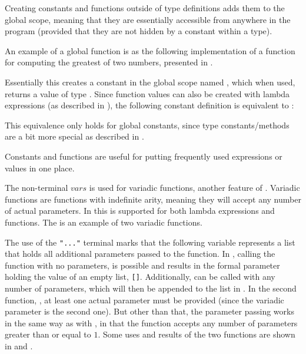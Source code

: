 Creating constants and functions outside of type definitions adds them to the
global scope, meaning that they are essentially accessible from anywhere in the
program (provided that they are not hidden by a constant within a type).

An example of a global function is as the following implementation of a function for
computing the greatest of two numbers, presented in .


Essentially this creates a constant in the global scope named ,
which when used, returns a value of type . Since function values
can also be created with lambda expressions (as described in
), the following constant definition is equivalent
to :


This equivalence only holds for global constants, since type constants/methods
are a bit more special as described in .

Constants and functions are useful for putting frequently used expressions or
values in one place.

The non-terminal $vars$ is used for variadic functions, another feature of
\productname{}. Variadic functions are functions with indefinite arity, meaning
they will accept any number of actual parameters. In \productname{} this is
supported for both lambda expressions and functions. The  
is an example of two variadic functions.


The use of the \texttt{"..."} terminal marks that the following variable
represents a list that holds all additional parameters passed to the function.
In , calling the function  with no parameters,
is possible and results in the formal parameter  holding the
value of an empty list, \texttt{[]}. Additionally,  can be called
with any number of parameters, which will then be appended to the list in
. In the second function, , at least one
actual parameter must be provided (since the variadic parameter is the second
one). But other than that, the parameter passing works in the same way as with
, in that the function accepts any number of parameters greater
than or equal to $1$. Some uses and results of the two functions are shown in
 and .

